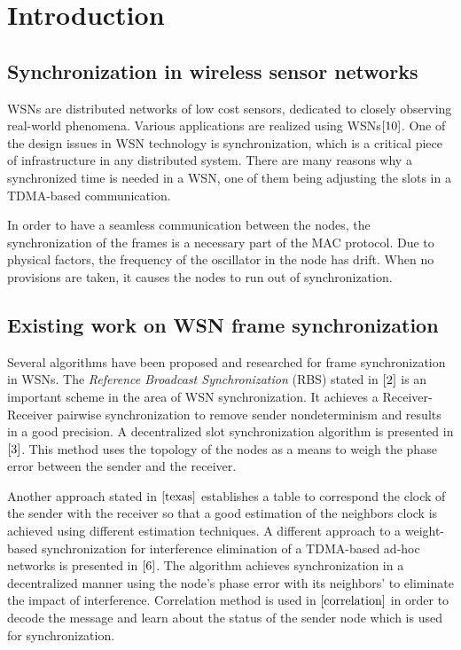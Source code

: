 \documentclass[journal]{IEEEtran}
\begin{document}
\section{\textbf{Introduction}}
\subsection{\textbf{Synchronization in wireless sensor networks}}
 WSNs are distributed networks of low cost sensors, dedicated to closely observing real-world phenomena.
 Various applications are realized using WSNs$\cite{10}$. One of the design issues in WSN technology is synchronization, which is a critical piece of infrastructure in any distributed system. There are many reasons why a synchronized time is needed in a WSN, one of them being adjusting the slots in a TDMA-based communication. \par
In order to have a seamless communication between the nodes, the synchronization of the frames is a necessary part of the MAC
protocol. Due to physical factors, the frequency of the oscillator in the node has drift. When no provisions are taken, it causes the nodes to run out of synchronization.
\subsection{\textbf{Existing work on WSN frame synchronization}}
 Several algorithms have been proposed and researched for
frame synchronization in WSNs. The \textit{Reference Broadcast
Synchronization} (RBS) stated in $\cite{2}$ is an important scheme
in the area of WSN synchronization. It achieves a Receiver-Receiver
pairwise synchronization to remove sender nondeterminism and results
in a good precision. A decentralized slot
synchronization algorithm is presented in
$\cite{3}$. This method uses the topology of the nodes as a means to
weigh the phase error between the sender and the receiver.
\par
Another approach stated in $\cite{texas}$ establishes a table to correspond
the clock of the sender with the receiver so that a
good estimation of the neighbors clock is achieved using different
estimation techniques. A different approach to a weight-based
synchronization for interference elimination of a TDMA-based ad-hoc
networks is presented in $\cite{6}$. The algorithm achieves
synchronization in a decentralized manner using the node's phase
error with its neighbors' to eliminate the impact of interference.
Correlation method is used in $\cite{correlation}$ in order to
decode the message and learn about the status of the sender node
which is used for synchronization.
\end{document}
